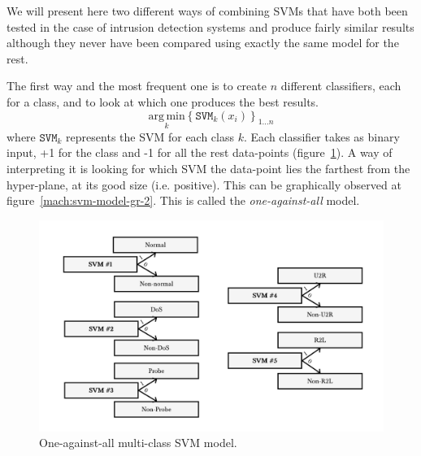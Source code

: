 We will present here two different ways of combining SVMs that have both been tested in the case of intrusion detection systems \cite{Kuang2014ADetection}\cite{SumaiyaThaseen2017IntrusionSVM} and produce fairly similar results although they never have been compared using exactly the same model for the rest.

The first way and the most frequent one is to create $n$ different classifiers, each for a class, and to look at which one produces the best results. 
\begin{equation}
    \underset{k}{\mathrm{arg}\,\mathrm{min}}\left\{ \mathtt{SVM}_k (x_i)   \right\}_{1 \ldots n} 
\end{equation}
where $\mathtt{SVM}_k$ represents the SVM for each class $k$. Each classifier takes as binary input, +1 for the class and -1 for all the rest data-points  (figure~\ref{mach:svm-model-1}). A way of interpreting it is looking for which SVM the data-point lies the farthest from the hyper-plane, at its good size (i.e. positive). This can be graphically observed at figure~\ref{mach:svm-model-gr-2}. This is called the \emph{one-against-all} model.

\begin{figure}[ht!]
    \centering
    \includegraphics[width=.85\textwidth]{parts/chap-2/img-2/model-svm-1.png}
    \caption{One-against-all multi-class SVM model.} 
    \label{mach:svm-model-1}
\end{figure}

